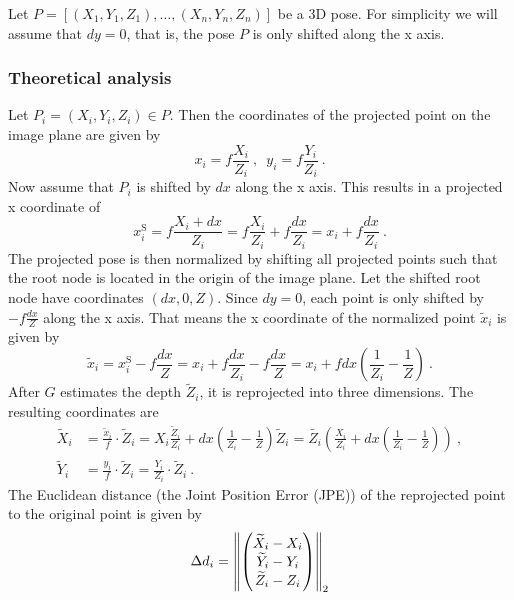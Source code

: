 Let $P = [(X_1, Y_1, Z_1), \dotsc, (X_n, Y_n, Z_n)]$ be a 3D pose.
For simplicity we will assume that $dy = 0$, that is, the pose $P$ is only shifted along the x axis.

\subsubsection{Theoretical analysis}
\label{sec:x-shift-error-theoretical}
Let $P_i = (X_i, Y_i, Z_i) \in P$.
Then the coordinates of the projected point on the image plane are given by
\begin{equation}
	x_i = f \frac{X_i}{Z_i} \ ,\enspace y_i = f \frac{Y_i}{Z_i} \ .
\end{equation}
Now assume that $P_i$ is shifted by $dx$ along the x axis.
This results in a projected x coordinate of
\begin{equation}
	x_i^\mathrm{S} = f \frac{X_i + dx}{Z_i} = f \frac{X_i}{Z_i} + f \frac{dx}{Z_i} = x_i + f \frac{dx}{Z_i}\ .
\end{equation}
The projected pose is then normalized by shifting all projected points such that the root node is located in the origin of the image plane. 
Let the shifted root node have coordinates $(dx, 0, Z)$.
Since $dy = 0$, each point is only shifted by $- f \frac{dx}{Z}$ along the x axis.
That means the x coordinate of the normalized point $\widetilde{x}_i$ is given by
\begin{equation}
	\widetilde{x}_i
	= x_i^\mathrm{S} - f \frac{dx}{Z}
	= x_i + f \frac{dx}{Z_i} - f \frac{dx}{Z}
	= x_i + f dx (\frac{1}{Z_i} - \frac{1}{Z})\ .
\end{equation}
After $G$ estimates the depth $\widetilde{Z}_i$, it is reprojected into three dimensions. The resulting coordinates are 
\begin{align}
	\label{eq:re-projected-X}
	\widetilde{X}_i &= \frac{\widetilde{x}_i}{f} \cdot \widetilde{Z}_i
	= X_i \frac{\widetilde{Z}_i}{Z_i} + dx (\frac{1}{Z_i} - \frac{1}{Z}) \widetilde{Z}_i
	= \widetilde{Z_i} \left( \frac{X_i}{Z_i} + dx \left( \frac{1}{Z_i} - \frac{1}{Z} \right) \right) \ , \\
	\label{eq:re-projected-Y}
	\widetilde{Y}_i &= \frac{y_i}{f} \cdot \widetilde{Z}_i = \frac{Y_i}{Z_i} \cdot \widetilde{Z}_i \ .
\end{align}
The Euclidean distance (the Joint Position Error (JPE)) of the reprojected point to the original point is given by
\begin{equation}
\label{eq:delta-d}
	\Delta d_i = \norm{ 
	\begin{pmatrix}
		\widetilde{X}_i - X_i \\
		\widetilde{Y}_i - Y_i \\
		\widetilde{Z}_i - Z_i
	\end{pmatrix}
	}_2
\end{equation}
